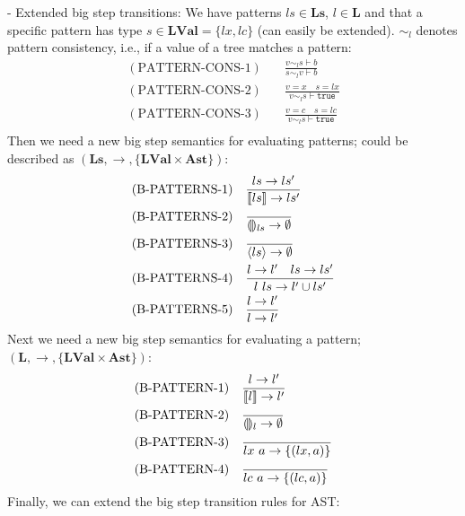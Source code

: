 \documentclass[10pt,a4paper,english]{article}
\begin{document}
- Extended big step transitions:
We have patterns $ls \in \textbf{Ls}$, $l \in \textbf{L}$ and that a specific pattern has type $s \in \textbf{LVal} = \{lx,lc\}$ (can easily be extended). $\sim_l$ denotes pattern consistency, i.e., if a value of a tree matches a pattern:
\begin{align}
  (\text{PATTERN-CONS-1}) \quad &\frac{v\sim_l s \vdash b}{s\sim_l v \vdash b}\\
  (\text{PATTERN-CONS-2}) \quad &\frac{v = x \quad s = lx}{v\sim_l s \vdash \texttt{true}}\\
  (\text{PATTERN-CONS-3}) \quad &\frac{v = c \quad s = lc}{v\sim_l s \vdash \texttt{true}}\\
\end{align}
Then we need a new big step semantics for evaluating patterns; could be described as $(\textbf{Ls},\to,\{\textbf{LVal}\times\textbf{Ast}\})$:
\begin{align}
  (\text{B-PATTERNS-1})\quad& \frac{ls\to ls'}{\llbracket ls \rrbracket\to ls'}\\
  (\text{B-PATTERNS-2})\quad& \frac{}{\llparenthesis\rrparenthesis_{ls}\to\emptyset}\\
  (\text{B-PATTERNS-3})\quad& \frac{}{\langle ls \rangle\to\emptyset}\\
  (\text{B-PATTERNS-4})\quad& \frac{l \to l' \quad ls\to ls'}{l~ls\to l' \cup ls'}\\
  (\text{B-PATTERNS-5})\quad& \frac{l \to l'}{l\to l'}
\end{align}
Next we need a new big step semantics for evaluating a pattern; $(\textbf{L},\to,\{\textbf{LVal}\times\textbf{Ast}\})$:
\begin{align}
  (\text{B-PATTERN-1})\quad& \frac{l\to l'}{\llbracket l \rrbracket\to l'}\\
  (\text{B-PATTERN-2})\quad& \frac{}{\llparenthesis\rrparenthesis_{l}\to\emptyset}\\
  (\text{B-PATTERN-3})\quad& \frac{}{lx~a\to\{(lx,a)\}}\\
  (\text{B-PATTERN-4})\quad& \frac{}{lc~a\to\{(lc,a)\}}\\
\end{align}
Finally, we can extend the big step transition rules for AST:
\end{document}
